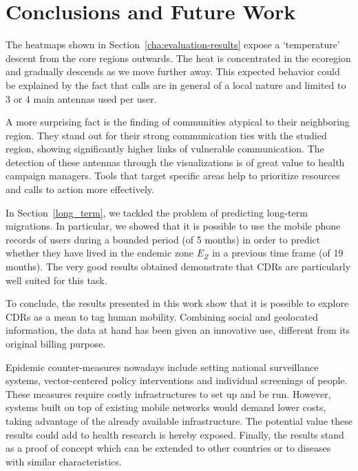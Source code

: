 
\chapter{Conclusions and Future Work}
\label{cha:conclusions}

The heatmaps shown in Section~\cref{cha:evaluation-results} expose a `temperature' descent from the core regions outwards. The heat is concentrated in the ecoregion and gradually descends as we move further away. This expected behavior could be explained by the fact that calls are in general of a local nature and limited to 3 or 4 main antennas used per user.

A more surprising fact is the finding of communities atypical to their neighboring region. They stand out for their strong communication ties with the studied region, showing significantly higher links of vulnerable communication. The detection of these antennas through the visualizations is of great value to health campaign managers. Tools that target specific areas help to prioritize resources and calls to action more effectively.

In Section~\cref{long_term}, we tackled the problem of predicting long-term migrations. In particular, we showed that it is possible to use the mobile phone records of users during a bounded period (of 5 months) in order to predict whether they have lived in the endemic zone $E_Z$ in a previous time frame (of 19 months).
The very good results obtained demonstrate that CDRs are particularly well suited for this task.

To conclude, the results presented in this work show that it is possible to explore CDRs as a mean to tag human mobility. Combining social and geolocated information, the data at hand has been given an innovative use, different from its original billing purpose.

Epidemic counter-measures nowadays include setting national surveillance systems, vector-centered policy interventions and individual screenings of people. These measures require costly infrastructures to set up and be run. However, systems built on top of existing mobile networks would demand lower costs, taking advantage of the already available infrastructure. The potential value these results could add to health research is hereby exposed.
Finally, the results stand as a proof of concept which can be extended to other countries or to diseases with similar characteristics.



